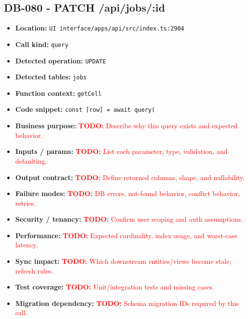 \documentclass[11pt]{article}
\newcommand{\todoitem}[1]{\textcolor{red}{\textbf{TODO:} #1}}
\begin{document}
\subsection{DB-080 - PATCH /api/jobs/:id}
\begin{itemize}[leftmargin=1.5em]
\item \textbf{Location:} \texttt{UI interface/apps/api/src/index.ts:2904}
\item \textbf{Call kind:} \texttt{query}
\item \textbf{Detected operation:} \texttt{UPDATE}
\item \textbf{Detected tables:} \texttt{jobs}
\item \textbf{Function context:} \texttt{getCell}
\item \textbf{Code snippet:} \texttt{const [row] = await query(}
\item \textbf{Business purpose:} \todoitem{Describe why this query exists and expected behavior.}
\item \textbf{Inputs / params:} \todoitem{List each parameter, type, validation, and defaulting.}
\item \textbf{Output contract:} \todoitem{Define returned columns, shape, and nullability.}
\item \textbf{Failure modes:} \todoitem{DB errors, not-found behavior, conflict behavior, retries.}
\item \textbf{Security / tenancy:} \todoitem{Confirm user scoping and auth assumptions.}
\item \textbf{Performance:} \todoitem{Expected cardinality, index usage, and worst-case latency.}
\item \textbf{Sync impact:} \todoitem{Which downstream entities/views become stale; refresh rules.}
\item \textbf{Test coverage:} \todoitem{Unit/integration tests and missing cases.}
\item \textbf{Migration dependency:} \todoitem{Schema migration IDs required by this call.}
\end{itemize}
\end{document}
